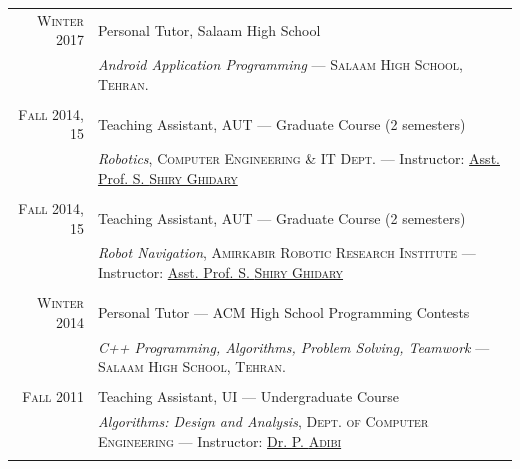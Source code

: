 

\vspace{1mm}


\begin{tabular}{r|p{}}

  \textsc{Winter} 2017 &
  Personal Tutor, Salaam High School \\
  & \emph{Android Application Programming} — \small\textsc{Salaam High School, Tehran.}\normalsize
  \\  \vspace{-3mm} \\

  \textsc{Fall} 2014, 15 &
  Teaching Assistant, \textsc{AUT} — Graduate Course (2 semesters) \\
  & \emph{Robotics}, \small\textsc{Computer Engineering \& IT Dept.} —
    Instructor: \href{https://scholar.google.com/citations?user=eezKfB4AAAAJ&hl=en}{Asst. Prof. S. \textsc{Shiry Ghidary}}\normalsize
  \\  \vspace{-3mm} \\

  \textsc{Fall} 2014, 15 &
  Teaching Assistant, \textsc{AUT} — Graduate Course (2 semesters) \\
  & \emph{Robot Navigation}, \small\textsc{Amirkabir Robotic Research Institute} —
    Instructor: \href{https://scholar.google.com/citations?user=eezKfB4AAAAJ&hl=en}{Asst. Prof. S. \textsc{Shiry Ghidary}}\normalsize
  \\  \vspace{-3mm} \\

  \textsc{Winter} 2014 &
  Personal Tutor — ACM High School Programming Contests \\
  & \emph{C++ Programming, Algorithms, Problem Solving, Teamwork} — \small\textsc{Salaam High School, Tehran.}\normalsize
  \\  \vspace{-3mm} \\

  \textsc{Fall} 2011 &
  Teaching Assistant, \textsc{UI} — Undergraduate Course \\
  & \emph{Algorithms: Design and Analysis}, \small\textsc{Dept. of Computer Engineering} —
    Instructor: \href{http://engold.ui.ac.ir/~adibi/}{Dr. P. \textsc{Adibi}}\normalsize
  \\  \vspace{-3mm} \\


\end{tabular}

